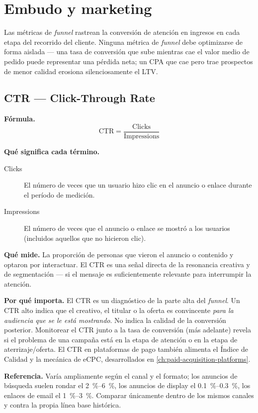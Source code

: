 \section{Embudo y marketing}

Las métricas de \emph{funnel} rastrean la conversión de atención en ingresos en cada etapa
del recorrido del cliente. Ninguna métrica de \emph{funnel} debe optimizarse de forma
aislada --- una tasa de conversión que sube mientras cae el valor medio de pedido puede
representar una pérdida neta; un CPA que cae pero trae prospectos de menor calidad erosiona
silenciosamente el LTV.

\subsection{CTR --- Click-Through Rate}

\textbf{Fórmula.}
\[
  \mathrm{CTR} = \frac{\text{Clicks}}{\text{Impressions}}
\]

\textbf{Qué significa cada término.}
\begin{description}
  \item[Clicks] El número de veces que un usuario hizo clic en el anuncio o enlace durante
    el período de medición.
  \item[Impressions] El número de veces que el anuncio o enlace se mostró a los usuarios
    (incluidos aquellos que no hicieron clic).
\end{description}

\textbf{Qué mide.} La proporción de personas que vieron el anuncio o contenido y optaron por
interactuar. El CTR es una señal directa de la resonancia creativa y de segmentación ---
si el mensaje es suficientemente relevante para interrumpir la atención.

\textbf{Por qué importa.} El CTR es un diagnóstico de la parte alta del \emph{funnel}. Un
CTR alto indica que el creativo, el titular o la oferta es convincente \emph{para la
audiencia que se le está mostrando}. No indica la calidad de la conversión posterior. Monitorear
el CTR junto a la tasa de conversión (más adelante) revela si el problema de una campaña
está en la etapa de atención o en la etapa de aterrizaje/oferta. El CTR en plataformas de
pago también alimenta el Índice de Calidad y la mecánica de eCPC, desarrollados en
\cref{ch:paid-acquisition-platforms}.

\textbf{Referencia.} Varía ampliamente según el canal y el formato; los anuncios de búsqueda
suelen rondar el \qty{2}{\percent}--\qty{6}{\percent}, los anuncios de display el
\qty{0.1}{\percent}--\qty{0.3}{\percent}, los enlaces de email el
\qty{1}{\percent}--\qty{3}{\percent}. Comparar únicamente dentro de los mismos canales y
contra la propia línea base histórica.


